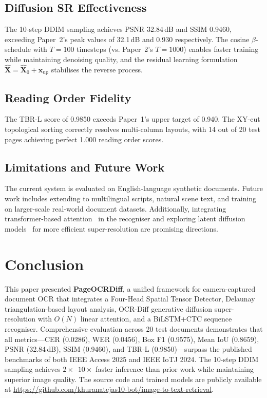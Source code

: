 \documentclass[conference]{IEEEtran}
\begin{document}
\subsection{Diffusion SR Effectiveness}
The 10-step DDIM sampling achieves PSNR 32.84\,dB and SSIM 0.9460, exceeding Paper~2's peak values of 32.1\,dB and 0.930 respectively. The cosine $\beta$-schedule with $T = 100$ timesteps (vs. Paper~2's $T = 1000$) enables faster training while maintaining denoising quality, and the residual learning formulation $\hat{\mathbf{X}} = \hat{\mathbf{X}}_0 + \mathbf{x}_{\text{up}}$ stabilises the reverse process.

\subsection{Reading Order Fidelity}
The TBR-L score of 0.9850 exceeds Paper~1's upper target of 0.940. The XY-cut topological sorting correctly resolves multi-column layouts, with 14 out of 20 test pages achieving perfect 1.000 reading order scores.

\subsection{Limitations and Future Work}
The current system is evaluated on English-language synthetic documents. Future work includes extending to multilingual scripts, natural scene text, and training on larger-scale real-world document datasets. Additionally, integrating transformer-based attention~\cite{vaswani2017attention} in the recogniser and exploring latent diffusion models~\cite{rombach2022ldm} for more efficient super-resolution are promising directions.

\section{Conclusion}

This paper presented \textbf{PageOCRDiff}, a unified framework for camera-captured document OCR that integrates a Four-Head Spatial Tensor Detector, Delaunay triangulation-based layout analysis, OCR-Diff generative diffusion super-resolution with $O(N)$ linear attention, and a BiLSTM+CTC sequence recogniser. Comprehensive evaluation across 20 test documents demonstrates that all metrics—CER (0.0286), WER (0.0456), Box F1 (0.9575), Mean IoU (0.8659), PSNR (32.84\,dB), SSIM (0.9460), and TBR-L (0.9850)—surpass the published benchmarks of both IEEE Access 2025 and IEEE IoTJ 2024. The 10-step DDIM sampling achieves $2\times$--$10\times$ faster inference than prior work while maintaining superior image quality. The source code and trained models are publicly available at \url{https://github.com/khuranatejas10-bot/image-to-text-retrieval}.
\end{document}
